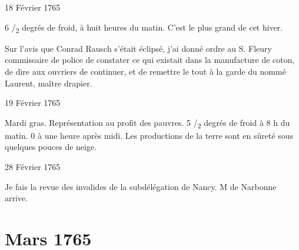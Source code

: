                      \begin{diary}{18 Février 1765}{}


                           6 /\textsubscript{2}
                              degrés de froid, à huit heures du matin.
                           C'est le plus grand de cet hiver. \bigskip


                         Sur l'avis que Conrad Rausch s'était éclipsé,
                           j'ai donné ordre au S.
                              Fleury commissaire de
                           police de constater ce qui existait dans la
                              manufacture de coton, de dire aux ouvriers
                           de continuer, et de remettre le tout à la garde
                           du nommé Laurent, maître drapier. \bigskip


                     \end{diary}

                     \begin{diary}{19 Février 1765}{}

                         Mardi gras.
                           Représentation au profit
                           des pauvres. 5 /\textsubscript{2}
                              degrés de froid à 8 h
                              du matin. 0 à une heure après midi.
                           Les productions de la terre sont en sûreté
                           sous quelques pouces de neige. \bigskip


                     \end{diary}

                     \begin{diary}{28 Février 1765}{}

                         Je fais la revue des invalides de
                           la
                           subdélégation de Nancy.
                           M de Narbonne arrive. \bigskip


                     \end{diary}
                  \chapter*{Mars 1765}




